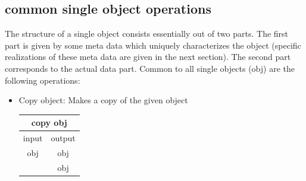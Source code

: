 \documentclass[12pt,a4paper]{article}
\newcommand{\bet}[1]{\begin{center}
		     \begin{tabular}{|c|c|}
		     \hline
		     \multicolumn{2}{|c|}{#1}\\
		     \hline\hline
		     input & output \\
                     \hline}
\newcommand{\eet}{\hline
		  \end{tabular}
		  \end{center}}
\begin{document}
\subsection{common single object operations}

The structure of a single object consists essentially out of 
two parts. The first part is given by some meta data which 
uniquely characterizes the object (specific realizations of these
meta data are given in the next section). The second part corresponds
to the actual data part. Common to all single objects (obj) are the 
following operations:

\begin{itemize}
\item Copy object:
\newline
Makes a copy of the given object  
\bet{copy obj}
obj & obj \\
    & obj \\
\eet


\end{itemize}
\end{document}
